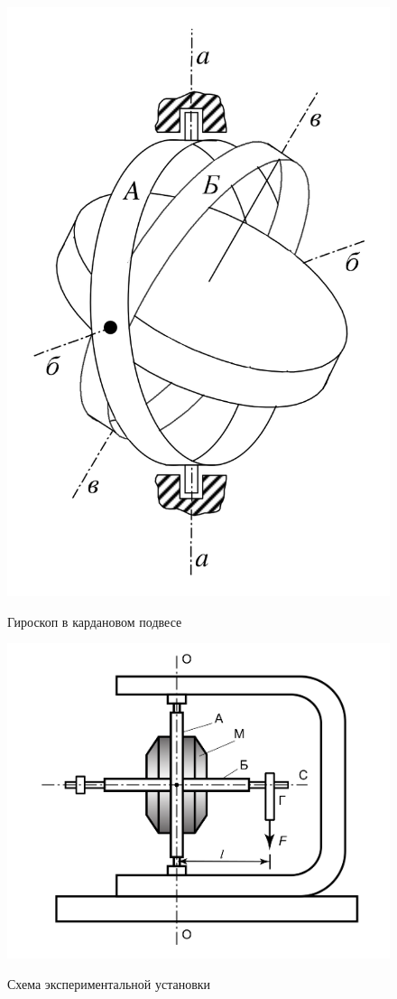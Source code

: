 \documentclass[a4paper,12pt]{article} %
\begin{document}
\begin{figure} [H]
  \includegraphics[scale=0.3]{./data/рис 2.png} \label{pic:2}
  \caption[Рис. 2]{Гироскоп в кардановом подвесе}
  \includegraphics[scale=0.3]{./data/рис 3.png} \label{pic:3}
  \caption[Рис. 3]{Схема экспериментальной установки}
\end{figure}
\end{document}
